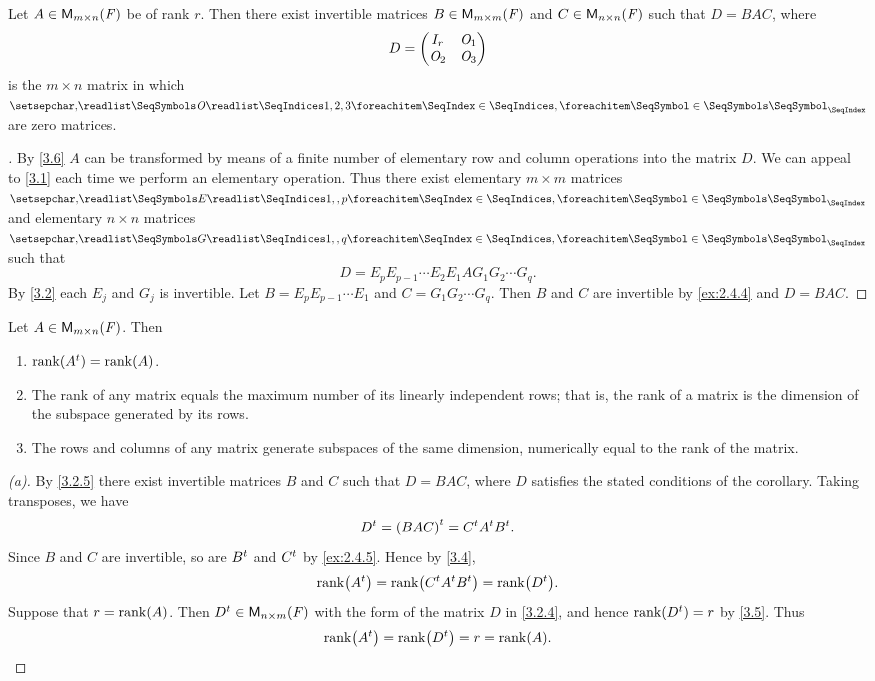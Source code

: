 \begin{cor}\label{3.2.4}
  Let \(A \in \mathsf{M}_{{m} \times n}({\mathit{F}})\) be of rank \(r\).
  Then there exist invertible matrices \(B \in \mathsf{M}_{{m} \times m}({\mathit{F}})\) and \(C \in \mathsf{M}_{{n} \times n}({\mathit{F}})\) such that \(D = BAC\), where
  \[
    D = \begin{pmatrix}
      I_r   & \mathit{O}_1 \\
      \mathit{O}_2 & \mathit{O}_3
    \end{pmatrix}
  \]
  is the \(m \times n\) matrix in which \(\seq{\zm}{1,2,3}\) are zero matrices.
\end{cor}

\begin{proof}[]
  By \cref{3.6} \(A\) can be transformed by means of a finite number of elementary row and column operations into the matrix \(D\).
  We can appeal to \cref{3.1} each time we perform an elementary operation.
  Thus there exist elementary \(m \times m\) matrices \(\seq{E}{1,,p}\) and elementary \(n \times n\) matrices \(\seq{G}{1,,q}\) such that
  \[
    D = E_p E_{p - 1} \cdots E_2 E_1 A G_1 G_2 \cdots G_q.
  \]
  By \cref{3.2} each \(E_j\) and \(G_j\) is invertible.
  Let \(B = E_p E_{p - 1} \cdots E_1\) and \(C = G_1 G_2 \cdots G_q\).
  Then \(B\) and \(C\) are invertible by \cref{ex:2.4.4} and \(D = BAC\).
\end{proof}

\begin{cor}\label{3.2.5}
  Let \(A \in \mathsf{M}_{{m} \times n}({\mathit{F}})\).
  Then
  \begin{enumerate}
    \item \(\rk{\tp{A}} = \rk{A}\).
    \item The rank of any matrix equals the maximum number of its linearly independent rows;
          that is, the rank of a matrix is the dimension of the subspace generated by its rows.
    \item The rows and columns of any matrix generate subspaces of the same dimension, numerically equal to the rank of the matrix.
  \end{enumerate}
\end{cor}

\begin{proof}[(a)]
  By \cref{3.2.5} there exist invertible matrices \(B\) and \(C\) such that \(D = BAC\), where \(D\) satisfies the stated conditions of the corollary.
  Taking transposes, we have
  \[
    {D}^{t} = {\left\lparen BAC\right\rparen}^{t} = {C}^{t} {A}^{t} {B}^{t}.
  \]
  Since \(B\) and \(C\) are invertible, so are \({B}^{t}\) and \({C}^{t}\) by \cref{ex:2.4.5}.
  Hence by \cref{3.4},
  \[
    \rk{\tp{A}} = \rk{\tp{C} \tp{A} \tp{B}} = \rk{\tp{D}}.
  \]
  Suppose that \(r = \rk{A}\).
  Then \({D}^{t} \in \mathsf{M}_{{n} \times m}({\mathit{F}})\) with the form of the matrix \(D\) in \cref{3.2.4}, and hence \(\rk{\tp{D}} = r\) by \cref{3.5}.
  Thus
  \[
    \rk{\tp{A}} = \rk{\tp{D}} = r = \rk{A}.
  \]
\end{proof}

